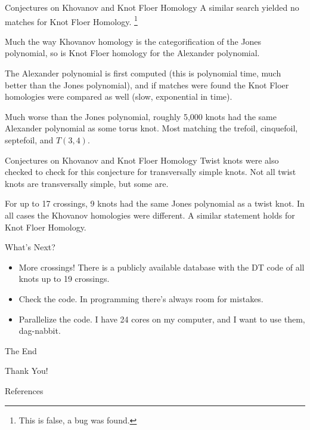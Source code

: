 \documentclass{beamer}
\begin{document}
    \begin{frame}{Conjectures on Khovanov and Knot Floer Homology}
        A similar search yielded no matches for Knot Floer Homology.%
        \footnote{%
            \textbf{\color{red}{Correction:}}
            This is false, a bug was found.
        }
        \par\hfill\par
        Much the way Khovanov homology is the categorification of the Jones
        polynomial, so is Knot Floer homology for the Alexander polynomial.
        \par\hfill\par
        The Alexander polynomial is first computed (this is polynomial time,
        much better than the Jones polynomial), and if matches were found the
        Knot Floer homologies were compared as well (slow, exponential in time).
        \par\hfill\par
        Much worse than the Jones polynomial, roughly 5,000 knots had the
        same Alexander polynomial as some torus knot. Most matching
        the trefoil, cinquefoil, septefoil, and $T(3,4)$.
    \end{frame}
    \begin{frame}{Conjectures on Khovanov and Knot Floer Homology}
        Twist knots were also checked to check for this conjecture for
        transversally simple knots. Not all twist knots are transversally
        simple, but some are.
        \par\hfill\par
        For up to 17 crossings, 9 knots had the same Jones polynomial as a
        twist knot. In all cases the Khovanov homologies were different.
        A similar statement holds for Knot Floer Homology.
    \end{frame}
    \begin{frame}{What's Next?}
        \begin{itemize}
            \item More crossings! There is a publicly available database with
                the DT code of all knots up to 19 crossings.
            \item Check the code. In programming there's always room for
                mistakes.
            \item Parallelize the code. I have 24 cores on my computer, and I
                want to use them, dag-nabbit.
        \end{itemize}
    \end{frame}
    \begin{frame}{The End}
        \begin{center}
            Thank You!
        \end{center}
    \end{frame}
    \begin{frame}[allowframebreaks]{References}
        
        
    \end{frame}
\end{document}
